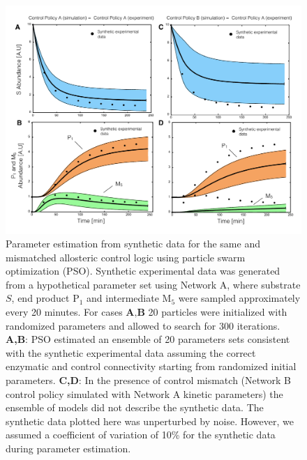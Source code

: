 \documentclass[12pt]{article}
\begin{document}
\clearpage

\begin{figure}
\centering
\includegraphics[width=1.0\textwidth]{./figs/Figure-5-ParameterFit.pdf}
\caption{Parameter estimation from synthetic data for the same and mismatched allosteric control logic using particle swarm optimization (PSO). 
Synthetic experimental data was generated from a hypothetical parameter set using Network A, 
where substrate $S$, end product P$_{1}$ and intermediate M$_5$ were sampled approximately every 20 minutes. 
For cases $\textbf{A,B}$ 20 particles were initialized with randomized parameters and allowed to search for 300 iterations. 
\textbf{A,B}: PSO estimated an ensemble of 20 parameters sets consistent with the synthetic experimental data assuming the correct
enzymatic and control connectivity starting from randomized initial parameters.
\textbf{C,D}: In the presence of control mismatch (Network B control policy simulated with Network A kinetic parameters) 
the ensemble of models did not describe the synthetic data. The synthetic data plotted here was unperturbed by noise. 
However, we assumed a coefficient of variation of 10\% for the synthetic data during parameter estimation.
}\label{fig-parameter-fit}
\end{figure}

\clearpage
\end{document}
